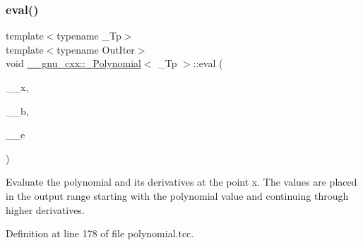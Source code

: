 \subsubsection{\texorpdfstring{eval()}{eval()}\hspace{0.1cm}{\footnotesize\ttfamily [2/4]}}
{\footnotesize\ttfamily template$<$typename \+\_\+\+Tp$>$ \\
template$<$typename Out\+Iter$>$ \\
void \hyperlink{class____gnu__cxx_1_1__Polynomial}{\+\_\+\+\_\+gnu\+\_\+cxx\+::\+\_\+\+Polynomial}$<$ \+\_\+\+Tp $>$\+::eval (\begin{DoxyParamCaption}\item[{typename \hyperlink{class____gnu__cxx_1_1__Polynomial}{\+\_\+\+Polynomial}$<$ \+\_\+\+Tp $>$\+::\hyperlink{class____gnu__cxx_1_1__Polynomial_a725563351f50e76084a7a016c06f8a53}{value\+\_\+type}}]{\+\_\+\+\_\+x,  }\item[{Out\+Iter}]{\+\_\+\+\_\+b,  }\item[{Out\+Iter}]{\+\_\+\+\_\+e }\end{DoxyParamCaption})}

Evaluate the polynomial and its derivatives at the point x. The values are placed in the output range starting with the polynomial value and continuing through higher derivatives. 

Definition at line 178 of file polynomial.\+tcc.


